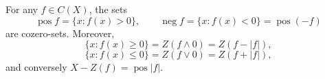 For any $f \in C(X)$, the sets
$$\operatorname{pos} f = \{x: f(x) > 0\}, \qquad \operatorname{neg} f = \{x: f(x) < 0\} = \operatorname{pos}(-f)$$
are cozero-sets. Moreover,
$$\{x: f(x) \geq 0\} = Z(f \wedge 0) = Z(f - |f|),$$
$$\{x: f(x) \leq 0\} = Z(f \vee 0) = Z(f + |f|),$$
and conversely $X - Z(f) = \operatorname{pos} |f|$.
